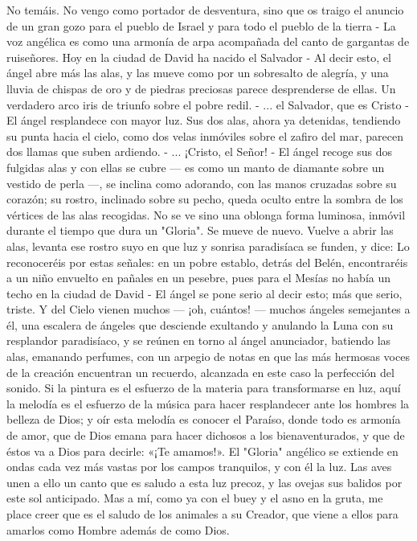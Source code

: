 \documentclass[12pt]{book} %
\begin{document}
No temáis. No vengo como portador de desventura, sino que os traigo el anuncio de un gran gozo para el pueblo de Israel y para todo el pueblo de la tierra - La voz angélica es como una armonía de arpa acompañada del canto de gargantas de ruiseñores. 
Hoy en la ciudad de David ha nacido el Salvador - Al decir esto, el ángel abre más las alas, y las mueve como por un 
sobresalto de alegría, y una lluvia de chispas de oro y de piedras preciosas parece desprenderse de ellas. Un verdadero arco iris de triunfo sobre el pobre redil. - ... el Salvador, que es Cristo - El ángel resplandece con mayor luz. Sus dos alas, ahora ya detenidas, tendiendo su punta hacia el cielo, como dos velas inmóviles sobre el zafiro del mar, parecen dos llamas que suben ardiendo. - ... ¡Cristo, el Señor! - El ángel recoge sus dos fulgidas alas y con ellas se cubre — es como un manto de diamante sobre un vestido de perla —, se inclina como adorando, con las manos cruzadas sobre su corazón; su rostro, inclinado sobre su pecho, queda oculto entre la sombra de los vértices de las alas recogidas. No se ve sino una oblonga forma luminosa, inmóvil durante el tiempo que dura un "Gloria". 
Se mueve de nuevo. Vuelve a abrir las alas, levanta ese rostro suyo en que luz y sonrisa paradisíaca se funden, y dice: 
Lo reconoceréis por estas señales: en un pobre establo, detrás del Belén, encontraréis a un niño envuelto en pañales 
en un pesebre, pues para el Mesías no había un techo en la ciudad de David - El ángel se pone serio al decir esto; más que serio, triste. 
Y del Cielo vienen muchos — ¡oh, cuántos! — muchos ángeles semejantes a él, una escalera de ángeles que desciende exultando y anulando la Luna con su resplandor paradisíaco, y se reúnen en torno al ángel anunciador, batiendo las alas, emanando perfumes, con un arpegio de notas en que las más hermosas voces de la creación encuentran un recuerdo, alcanzada en este caso la perfección del sonido. Si la pintura es el esfuerzo de la materia para transformarse en luz, aquí la melodía es el esfuerzo de la música para hacer resplandecer ante los hombres la belleza de Dios; y oír esta melodía es conocer el Paraíso, donde todo es armonía de amor, que de Dios emana para hacer dichosos a los bienaventurados, y que de éstos va a Dios para decirle: «¡Te amamos!». 
El "Gloria" angélico se extiende en ondas cada vez más vastas por los campos tranquilos, y con él la luz. Las aves unen a 
ello un canto que es saludo a esta luz precoz, y las ovejas sus balidos por este sol anticipado. Mas a mí, como ya con el buey y el asno en la gruta, me place creer que es el saludo de los animales a su Creador, que viene a ellos para amarlos como Hombre además de como Dios. 
\end{document}
